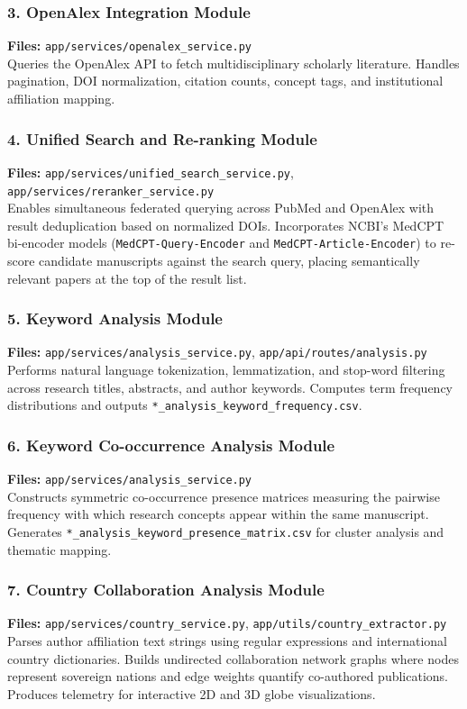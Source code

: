 \subsubsection{3. OpenAlex Integration Module}
\textbf{Files:} \texttt{app/services/openalex\_service.py}\\
Queries the OpenAlex API to fetch multidisciplinary scholarly literature. Handles pagination, DOI normalization, citation counts, concept tags, and institutional affiliation mapping.

\subsubsection{4. Unified Search and Re-ranking Module}
\textbf{Files:} \texttt{app/services/unified\_search\_service.py}, \texttt{app/services/reranker_service.py}\\
Enables simultaneous federated querying across PubMed and OpenAlex with result deduplication based on normalized DOIs. Incorporates NCBI's MedCPT bi-encoder models (\texttt{MedCPT-Query-Encoder} and \texttt{MedCPT-Article-Encoder}) to re-score candidate manuscripts against the search query, placing semantically relevant papers at the top of the result list.

\subsubsection{5. Keyword Analysis Module}
\textbf{Files:} \texttt{app/services/analysis\_service.py}, \texttt{app/api/routes/analysis.py}\\
Performs natural language tokenization, lemmatization, and stop-word filtering across research titles, abstracts, and author keywords. Computes term frequency distributions and outputs \texttt{*\_analysis\_keyword\_frequency.csv}.

\subsubsection{6. Keyword Co-occurrence Analysis Module}
\textbf{Files:} \texttt{app/services/analysis\_service.py}\\
Constructs symmetric co-occurrence presence matrices measuring the pairwise frequency with which research concepts appear within the same manuscript. Generates \texttt{*\_analysis\_keyword\_presence\_matrix.csv} for cluster analysis and thematic mapping.

\subsubsection{7. Country Collaboration Analysis Module}
\textbf{Files:} \texttt{app/services/country\_service.py}, \texttt{app/utils/country\_extractor.py}\\
Parses author affiliation text strings using regular expressions and international country dictionaries. Builds undirected collaboration network graphs where nodes represent sovereign nations and edge weights quantify co-authored publications. Produces telemetry for interactive 2D and 3D globe visualizations.

